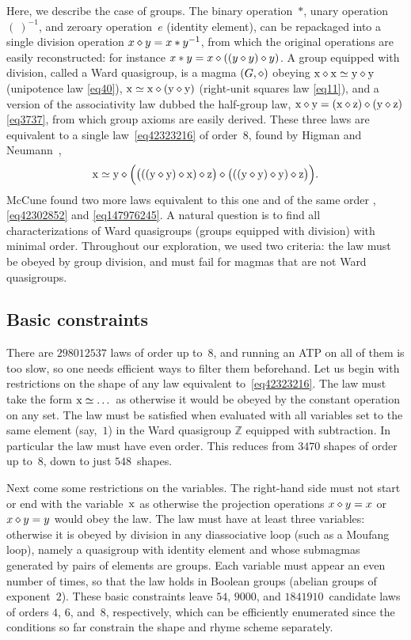 Here, we describe the case of groups.  The binary operation~$*$, unary operation~$(\ )^{-1}$, and zeroary operation~$e$ (identity element), can be repackaged into a single division operation $x \diamond y = x*y^{-1}$, from which the original operations are easily reconstructed: for instance $x*y=x\diamond((y\diamond y)\diamond y)$.  A group equipped with division, called a Ward quasigroup, is a magma $(G, \diamond)$ obeying $\mathrm{x} \diamond \mathrm{x} \simeq \mathrm{y} \diamond \mathrm{y}$ (unipotence law \eqref{eq40}), $\mathrm{x} \simeq \mathrm{x} \diamond (\mathrm{y} \diamond \mathrm{y})$ (right-unit squares law \eqref{eq11}), and a version of the associativity law dubbed the half-group law, $\mathrm{x} \diamond \mathrm{y} = (\mathrm{x} \diamond \mathrm{z}) \diamond (\mathrm{y} \diamond \mathrm{z})$ \eqref{eq3737}, from which group axioms are easily derived.
These three laws are equivalent to a single law~\eqref{eq42323216} of order~$8$, found by Higman and Neumann~\cite{higman-neumann},
\[
\mathrm{x} \simeq \mathrm{y} \diamond \Bigl(\bigl(((\mathrm{y} \diamond \mathrm{y}) \diamond \mathrm{x}) \diamond \mathrm{z}\bigr) \diamond \bigl(((\mathrm{y} \diamond \mathrm{y}) \diamond \mathrm{y}) \diamond \mathrm{z}\bigr)\Bigr) .
\]
McCune found two more laws equivalent to this one and of the same order \cite{mccune1993single}, \eqref{eq42302852} and \eqref{eq147976245}.  A natural question is to find all characterizations of Ward quasigroups (groups equipped with division) with minimal order.
Throughout our exploration, we used two criteria: the law must be obeyed by group division, and must fail for magmas that are not Ward quasigroups.

\subsection{Basic constraints}

There are $\num{298012537}$ laws of order up to~$8$, and running an ATP on all of them is too slow, so one needs efficient ways to filter them beforehand.  Let us begin with restrictions on the shape of any law equivalent to~\eqref{eq42323216}.
The law must take the form $\mathrm{x}\simeq\dots$ as otherwise it would be obeyed by the constant operation on any set.
The law must be satisfied when evaluated with all variables set to the same element (say,~$1$) in the Ward quasigroup $\mathbb{Z}$ equipped with subtraction.  In particular the law must have even order.
This reduces from $\num{3470}$ shapes of order up to~$8$, down to just $548$~shapes.

Next come some restrictions on the variables.
The right-hand side must not start or end with the variable~$\mathrm{x}$ as otherwise the projection operations $x\diamond y=x$ or $x\diamond y=y$ would obey the law.
The law must have at least three variables: otherwise it is obeyed by division in any diassociative loop (such as a Moufang loop), namely a quasigroup with identity element and whose submagmas generated by pairs of elements are groups.
Each variable must appear an even number of times, so that the law holds in Boolean groups (abelian groups of exponent~$2$).
These basic constraints leave $54$, $\num{9000}$, and $\num{1841910}$~candidate laws of orders $4$, $6$, and~$8$, respectively, which can be efficiently enumerated since the conditions so far constrain the shape and rhyme scheme separately.

